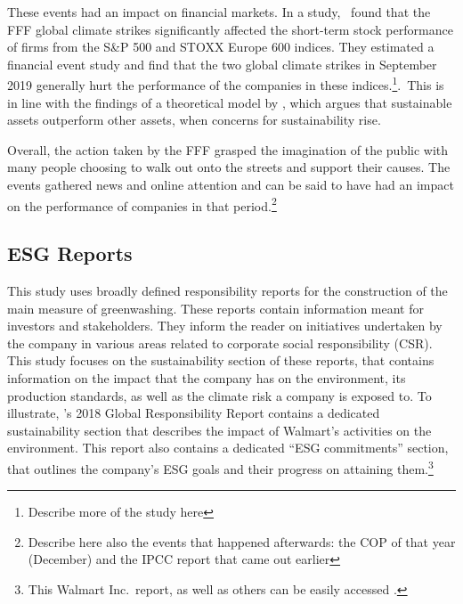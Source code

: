 \documentclass[12pt]{article}
\begin{document}
These events had an impact on financial markets. In a \citeyear{schusterStockPriceReactions2023} study,~\citeauthor{schusterStockPriceReactions2023} found that the FFF global climate strikes significantly affected the short-term stock performance of firms from the S\&P 500 and STOXX Europe 600 indices. They estimated a financial event study and find that the two global climate strikes in September 2019 generally hurt the performance of the companies in these indices.\footnote{Describe more of the study here}.\ This is in line with the findings of a theoretical model by \textcite{pastorSustainableInvestingEquilibrium2021}, which argues that sustainable assets outperform other assets, when concerns for sustainability rise.

Overall, the action taken by the FFF grasped the imagination of the public with many people choosing to walk out onto the streets and support their causes. The events gathered news and online attention and can be said to have had an impact on the performance of companies in that period.\footnote{Describe here also the events that happened afterwards: the COP of that year (December) and the IPCC report that came out earlier}

\subsection{ESG Reports}

This study uses broadly defined responsibility reports for the construction of the main measure of greenwashing. These reports contain information meant for investors and stakeholders. They inform the reader on initiatives undertaken by the company in various areas related to corporate social responsibility (CSR). This study focuses on the sustainability section of these reports, that contains information on the impact that the company has on the environment, its production standards, as well as the climate risk a company is exposed to. To illustrate, \citeauthor{walmart2018csr}'s 2018 Global Responsibility Report contains a dedicated sustainability section that describes the impact of Walmart's activities on the environment. This report also contains a dedicated ``ESG commitments'' section, that outlines the company's ESG goals and their progress on attaining them.\footnote{This Walmart Inc.~report, as well as others can be easily accessed \href{https://www.responsibilityreports.com/Company/walmart-inc}{}.}
\end{document}
